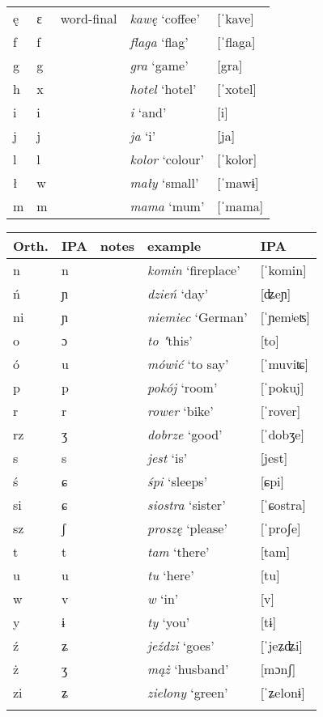{\begin{tabularx}{\textwidth}{llXll}
        ę & ɛ & word-final & \textit{kawę} `coffee' & [ˈkave]\\
        f & f &  & \textit{flaga} `flag' & [ˈflaga]\\
        g & g &  & \textit{gra} `game' & [gra]\\
        h & x &  & \textit{hotel} `hotel' & [ˈxotel]\\
        i & i &  & \textit{i} `and' & [i]\\
        j & j &  & \textit{ja} `i' & [ja]\\
        l & l &  & \textit{kolor} `colour' & [ˈkolor]\\
        ł & w &  & \textit{mały} `small' & [ˈmawɨ]\\
        m & m &  & \textit{mama} `mum' & [ˈmama]\\
        \midrule
    \end{tabularx}
    \newpage
    \begin{tabularx}{\textwidth}{llXll}
        \lsptoprule
        Orth. & IPA & notes & example & IPA\\
        \midrule
        n & n &  & \textit{komin} `fireplace' & [ˈkomin]\\
        ń & ɲ &  & \textit{dzień} `day' & [ʥeɲ]\\
        ni & ɲ &  & \textit{niemiec} `German' & [ˈɲemʲeʦ]\\
        o & ɔ &   & \textit{to} \textit{"}this' & [to]\\
        ó & u &  & \textit{mówić} `to say' & [ˈmuviʨ]\\
        p & p &  & \textit{pokój} `room' & [ˈpokuj]\\
        r & r &  & \textit{rower} `bike' & [ˈrover]\\
        rz & ʒ &  & \textit{dobrze} `good' & [ˈdobʒe]\\
        s & s &  & \textit{jest} `is' & [jest]\\
        ś & ɕ &  & \textit{śpi} `sleeps' & [ɕpi]\\
        si & ɕ &  & \textit{siostra} `sister' & [ˈɕostra]\\
        sz & ʃ &  & \textit{proszę} `please' & [ˈproʃe]\\
        t & t &  & \textit{tam} `there' & [tam]\\
        u & u &  & \textit{tu} `here' & [tu]\\
        w & v &  & \textit{w} `in' & [v]\\
        y & ɨ &  & \textit{ty} `you' & [tɨ]\\
        ź & ʑ &  & \textit{jeździ} `goes' & [ˈjeʑʥi]\\
        ż & ʒ &  & \textit{mąż} `husband' & [mɔnʃ]\\
        zi & ʑ &  & \textit{zielony} `green' & [ˈʑelonɨ]\\
        \lspbottomrule
    \end{tabularx}
}
